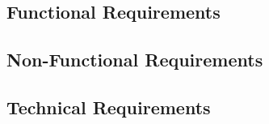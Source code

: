 \documentclass[../MasterThesis.tex]{subfiles}
\begin{document}












\subsection{Functional Requirements} \label{subsection:functionalrequirements}








\subsection{Non-Functional Requirements} \label{subsection:nonfunctionalrequirements}











\subsection{Technical Requirements} \label{subsection:technicalrequirements}
\end{document}

